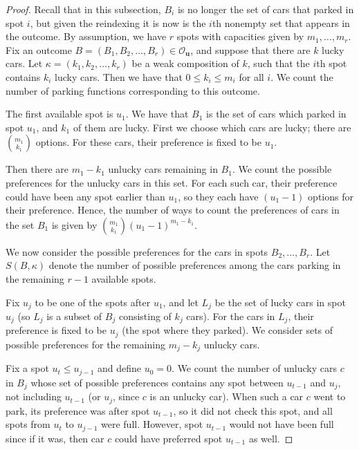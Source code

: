 \documentclass[reqno]{amsart}
\theoremstyle{definition}
\theoremstyle{remark}
\newcommand{\out}{\mathcal{O}}
\newcommand{\bsy}{\boldsymbol}
\begin{document}
\begin{proof}
Recall that in this subsection, $B_i$ is no longer the set of cars that parked in spot $i$, but given the reindexing it is now is the $i$th nonempty set that appears in the outcome. 
By assumption, we have $r$ spots with capacities given by $m_1,\ldots, m_r$. Fix an outcome $B =(B_1,B_2,\ldots, B_r)\in\out_{\bsy{u}}$, and suppose that there are $k$ lucky cars. Let $\kappa = (k_1,k_2,\ldots, k_r)$ be a weak composition of $k$, such that the $i$th spot contains $k_i$ lucky cars. Then we have that $0 \leq k_i \leq m_i$ for all $i$.
We count the number of parking functions corresponding to this outcome.

The first available spot is $u_1$.
We have that $B_1$ is the set of cars which parked in spot $u_1$, and $k_1$ of them are lucky. 
First we choose which cars are lucky; there are $ \binom{m_1}{k_1}$ options. For these cars, their preference is fixed to be $u_1$. 

Then there are $m_1-k_1$ unlucky cars remaining in $B_1$. We count the possible preferences for the unlucky cars in this set. 
For each such car, their preference could have been any spot earlier than $u_1$, so they each have $(u_1-1)$ options for their preference. Hence, the number of ways to count the preferences of cars in the set $B_1$ is given by 
$\binom{m_1}{k_1}(u_1-1)^{m_1-k_1}$.

We now consider the possible preferences for the cars in spots $B_2,\ldots, B_r$. Let $S(B,\kappa)$ denote the number of possible preferences among the cars parking in the remaining $r-1$ available spots.

Fix $u_j$ to be one of the spots after $u_1$, and let $L_j$ be the set of lucky cars in spot $u_j$ (so $L_j$ is a subset of $B_j$ consisting of $k_j$ cars). 
For the cars in $L_j$, their preference is fixed to be $u_j$ (the spot where they parked). 
We consider sets of  possible preferences for the remaining $m_j-k_j$ unlucky cars.



Fix a spot $u_t\leq u_{j-1}$ and define $u_0 =0$. 
We count the number of unlucky cars $c$ in $B_j$ whose set of possible preferences contains any spot between $u_{t-1}$ and $u_j$, not including $u_{t-1}$ (or $u_j$, since $c$ is an unlucky car). When such a car $c$ went to park, its preference was after spot $u_{t-1}$, so it did not check this spot, and all spots from $u_t$ to $u_{j-1}$ were full. However, spot $u_{t-1}$ would not have been full since if it was, then car $c$ could have preferred spot $u_{t-1}$ as well. 


\end{proof}
\end{document}

